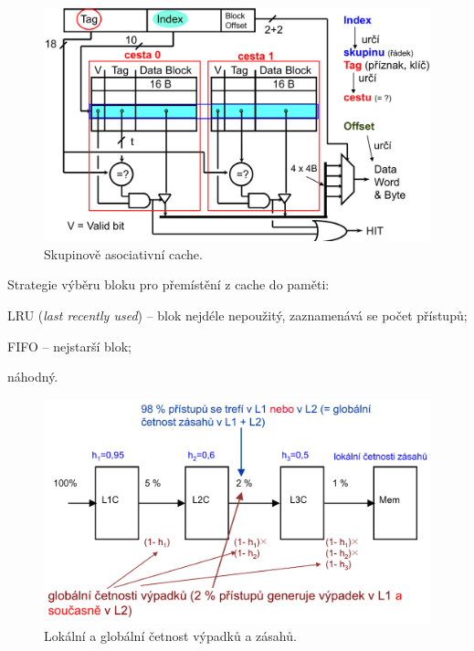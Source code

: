 \begin{compactitem}
    \begin{figure}[H]
        \centering
        \includegraphics[width=0.9\linewidth]{skupinove_asociativni_cache.pdf}
        \caption{Skupinově asociativní cache.}
    \end{figure}

    \item Strategie výběru bloku pro přemístění z cache do paměti: \begin{compactitem}
        \item LRU (\textit{last recently used}) -- blok nejdéle nepoužitý, zaznamenává se počet přístupů;
        \item FIFO -- nejstarší blok;
        \item náhodný.
    \end{compactitem}

    \begin{figure}[H]
        \centering
        \includegraphics[width=1\linewidth]{lokalni_a_globalni_cetnost_vypadku.pdf}
        \caption{Lokální a globální četnost výpadků a zásahů.}
    \end{figure}
\end{compactitem}

